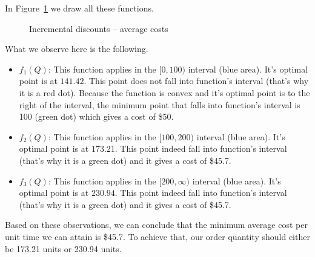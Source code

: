\begin{solution}
In Figure~\ref{fig:avgcost_incremental} we draw all these functions.

\begin{figure}[htbp]
\centering
{}
\caption{Incremental discounts -- average costs}
\label{fig:avgcost_incremental}
\end{figure}


What we observe here is the following.
\begin{itemize}
\item $f_1(Q)$: This function applies in the $[0,100)$ interval (blue area). It's optimal point is at $141.42$. This point does not fall into function's interval (that's why it is a red dot). Because the function is convex and it's optimal point is to the right of the interval, the minimum point that falls into function's interval is 100 (green dot) which gives a cost of \$50. 
\item $f_2(Q)$: This function applies in the $[100,200)$ interval (blue area). It's optimal point is at $173.21$. This point indeed fall into function's interval (that's why it is a green dot) and it gives a cost of \$45.7. 
\item $f_3(Q)$: This function applies in the $[200,\infty)$ interval (blue area). It's optimal point is at $230.94$. This point indeed fall into function's interval (that's why it is a green dot) and it gives a cost of \$45.7.  
\end{itemize}

Based on these observations, we can conclude that the minimum average cost per unit time we can attain is \$45.7. To achieve that, our order quantity should either be 173.21 units or 230.94 units.
\end{solution}

